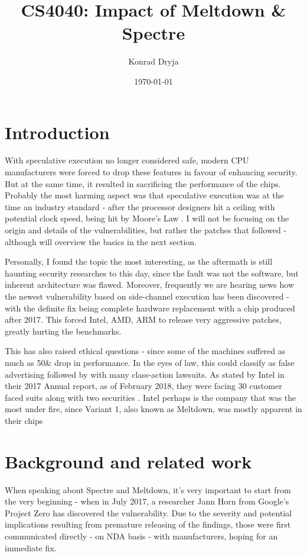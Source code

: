 \documentclass{csfourzero}
\title{CS4040: Impact of Meltdown \& Spectre}
\author{Konrad Dryja}
\date{\today}
\begin{document}
\maketitle


\section{Introduction}
\label{sec:intro}
With speculative execution no longer considered safe, modern CPU manufacturers were forced to drop these features in favour of enhancing security. But at the same time, it resulted in sacrificing the performance of the chips. Probably the most harming aspect was that speculative execution was at the time an industry standard - after the processor designers hit a ceiling with potential clock speed, being hit by Moore's Law \cite{schaller1997moore}. I will not be focusing on the origin and details of the vulnerabilities, but rather the patches that followed - although will overview the basics in the next section.  

Personally, I found the topic the most interesting, as the aftermath is still haunting security researches to this day, since the fault was not the software, but inherent architecture was flawed. Moreover, frequently we are hearing news how the newest vulnerability based on side-channel execution has been discovered - with the definite fix being complete hardware replacement with a chip produced after 2017. This forced Intel, AMD, ARM to release very aggressive patches, greatly hurting the benchmarks.

This has also raised ethical questions - since some of the machines suffered as much as 50\& drop in performance. In the eyes of law, this could classify as false advertising followed by with many class-action lawsuits. As stated by Intel in their 2017 Annual report, as of February 2018, they were facing 30 customer faced suits along with two securities \cite{intelreport}. Intel perhaps is the company that was the most under fire, since Variant 1, also known as Meltdown, was mostly apparent in their chips 

\section{Background and related work}
\label{sec:lit}

When speaking about Spectre and Meltdown, it's very important to start from the very beginning - when in July 2017, a researcher Jann Horn from Google's Project Zero has discovered the vulnerability. Due to the severity and potential implications resulting from premature releasing of the findings, those were first communicated directly - on NDA basis - with manufacturers, hoping for an immediate fix. 
\end{document}
